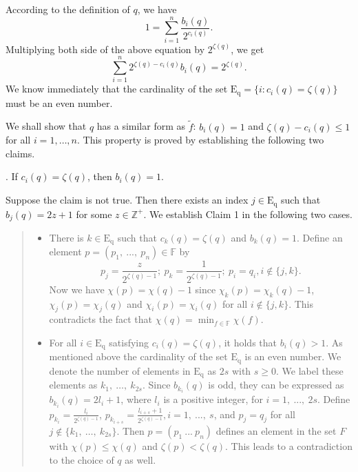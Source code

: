 \documentclass[a4paper, 11pt]{article}
\begin{document}
According to the definition of $q$, we have
\[1=\sum_{i=1}^{n}\frac{b_i(q)}{2^{c_i(q)}}.\]
Multiplying  both side of the above equation by $2^{\zeta(q)}$, we  get
\[\sum_{i=1}^{n}2^{\zeta(q)-c_i(q)}b_i(q)=2^{\zeta(q)}.\]
We know immediately that the cardinality of the set $\mathrm{E_q}=\big\{i:c_i(q)=\zeta(q)\big\}$ must be an  even number.

We shall show that $q$ has a similar form as  $\tilde{f}$: $b_i(q)=1$ and $\zeta(q)-c_i(q)\leq 1$ for all $i=1,\dots,n$.  This property is proved by establishing   the following two claims.

\medskip

. If $c_i(q)=\zeta(q)$, then $b_i(q)=1$.

\medskip
Suppose the claim is not true. Then there exists an index $j\in\mathrm{E_q}$ such that $b_j(q)=2z+1$ for some $z\in \mathbb{Z}^+$. We establish Claim 1 in the following  two cases.

\begin{quote}
\begin{itemize}
\item There is  $k\in \mathrm{E_q}$ such that $c_{k}(q)=\zeta(q)$ and $b_{k}(q)=1$. Define an element $p=(p_1,\ ...,\ p_n)\in \mathbb{F}$ by
$$
p_j=\frac{z}{2^{\zeta(q)-1}};\  p_{k}=\frac{1}{2^{\zeta(q)-1}};\  p_i=q_i, i\notin \{j,k\}.
$$
Now we have $\chi(p)=\chi(q)-1$ since  $\chi_{k}(p)=\chi_{k}(q)-1$, $\chi_{j}(p)=\chi_{j}(q)$ and $\chi_{i}(p)=\chi_{i}(q)$ for all $i\notin \{j,k\}$.
This contradicts  the fact that $\chi(q)=\min_{f\in \mathbb{F}}\chi(f)$.

\item  For all $i\in \mathrm{E_q}$ satisfying $c_i(q)=\zeta(q)$, it holds that $b_i(q)>1$. As mentioned above the cardinality of the set $\mathrm{E_q}$ is an  even number. We denote the number of elements in $\mathrm{E_q}$ as $2s$ with $s\geq 0$. We label these elements as $k_1,\ \dots,\ k_{2s}$. Since $b_{k_i}(q)$ is odd, they can be expressed as $b_{k_i}(q)=2l_i+1$, where $l_i$ is a positive integer, for $i=1,\ ...,\ 2s$.
Define $p_{k_i}=\frac{l_i}{2^{\zeta(q)-1}}$,  $p_{k_{i+s}}=\frac{l_{i+s}+1}{2^{\zeta(q)-1}}, i=1,\ ...,\ s$, and $p_j=q_j$ for all $j\notin\{k_1,\ \dots,\ k_{2s}\}$. Then $p=(p_1\ ...\ p_n)$ defines an element in the set $F$ with $\chi(p)\leq \chi(q)$ and $\zeta(p)<\zeta(q)$. This leads to a contradiction to the choice of $q$ as well.
\end{itemize}
\end{quote}
\medskip
\end{document}
